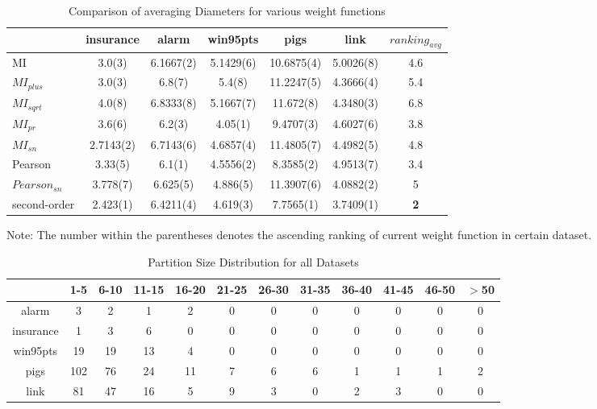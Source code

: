 \begin{table}[th]
\small
\begin{center}
\caption{\label{tab:maximumPath}Comparison of averaging Diameters for various weight functions}
\begin{tabular}{|l|cccccc|}
\hline
 & insurance & alarm & win95pts & pigs & link & $ranking_{avg}$ \\
\hline
MI      & 3.0(3)        & 6.1667(2) & 5.1429(6) & 10.6875(4) & 5.0026(8) & 4.6 \\
$MI_{plus}$ & 3.0(3)        & 6.8(7)    & 5.4(8)    & 11.2247(5) & 4.3666(4) & 5.4 \\
$MI_{sqrt}$ & 4.0(8)        & 6.8333(8) & 5.1667(7) & 11.672(8)  & 4.3480(3) & 6.8 \\
$MI_{pr}$   & 3.6(6)        & 6.2(3)    & 4.05(1)   & 9.4707(3)  & 4.6027(6) & 3.8 \\
$MI_{sn}$   & 2.7143(2)     & 6.7143(6) & 4.6857(4) & 11.4805(7) & 4.4982(5) & 4.8 \\
Pearson     & 3.33(5)       & 6.1(1)    & 4.5556(2) & 8.3585(2)  & 4.9513(7) & 3.4 \\
$Pearson_{sn}$ & 3.778(7)& 6.625(5)  & 4.886(5)  & 11.3907(6) & 4.0882(2) & 5 \\
second-order& 2.423(1)& 6.4211(4) & 4.619(3)  & 7.7565(1)  & 3.7409(1) & \textbf{2} \\
\hline
\end{tabular}

Note: The number within the parentheses denotes the ascending ranking of current weight function in certain dataset.

\end{center}
\end{table}

\begin{table}[th]
\begin{center}
\caption{\label{tab:partitionDist}Partition Size Distribution for all Datasets}
\scriptsize
\begin{tabular}{|c|c|c|c|c|c|c|c|c|c|c|c|}
\hline
 & 1-5 & 6-10 & 11-15 & 16-20 & 21-25 & 26-30 & 31-35 & 36-40 & 41-45 & 46-50 & $>$50 \\
\hline
alarm      & 3 & 2 & 1 & 2 & 0 & 0 & 0 & 0 & 0 & 0 & 0  \\
insurance  & 1 & 3 & 6 & 0 & 0 & 0 & 0 & 0 & 0 & 0 & 0  \\
win95pts   & 19& 19& 13& 4 & 0 & 0 & 0 & 0 & 0 & 0 & 0  \\
pigs       &102& 76& 24& 11& 7 & 6 & 6 & 1 & 1 & 1 & 2  \\
link       & 81& 47& 16& 5 & 9 & 3 & 0 & 2 & 3 & 0 & 0  \\
\hline
\end{tabular}
\end{center}
\end{table}

